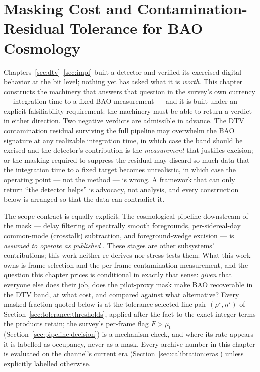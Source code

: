 
\chapter{Masking Cost and Contamination-Residual Tolerance for BAO Cosmology}
\label{sec:tolerance}

Chapters~\ref{sec:dtv}--\ref{sec:impl} built a detector and verified its exercised digital behavior at the bit level; nothing yet has asked what it is \emph{worth}. This chapter constructs the machinery that answers that question in the survey's own currency --- integration time to a fixed BAO measurement --- and it is built under an explicit falsifiability requirement: the machinery must be able to return a verdict in either direction. Two negative verdicts are admissible in advance. The DTV contamination residual surviving the full pipeline may overwhelm the BAO signature at any realizable integration time, in which case the band should be excised and the detector's contribution is the \emph{measurement} that justifies excision; or the masking required to suppress the residual may discard so much data that the integration time to a fixed target becomes unrealistic, in which case the operating point --- not the method --- is wrong. A framework that can only return ``the detector helps'' is advocacy, not analysis, and every construction below is arranged so that the data can contradict it.

The scope contract is equally explicit. The cosmological pipeline downstream of the mask --- delay filtering of spectrally smooth foregrounds, per-sidereal-day common-mode (crosstalk) subtraction, and foreground-wedge excision --- is \emph{assumed to operate as published} \cite{amiri2023detection,chime2024hybrid,seo2016wedge}. These stages are other subsystems' contributions; this work neither re-derives nor stress-tests them. What this work owns is frame selection and the per-frame contamination measurement, and the question this chapter prices is conditional in exactly that sense: \emph{given} that everyone else does their job, does the pilot-proxy mask make BAO recoverable in the DTV band, at what cost, and compared against what alternative? Every masked fraction quoted below is at the tolerance-selected fine pair $(\rho^\star,\eta^\star)$ of Section~\ref{sec:tolerance:thresholds}, applied after the fact to the exact integer terms the products retain; the survey's per-frame flag $F > \mu_0$ (Section~\ref{sec:pipeline:decision}) is a mechanism check, and where its rate appears it is labelled as occupancy, never as a mask. Every archive number in this chapter is evaluated on the channel's current era (Section~\ref{sec:calibration:eras}) unless explicitly labelled otherwise.

